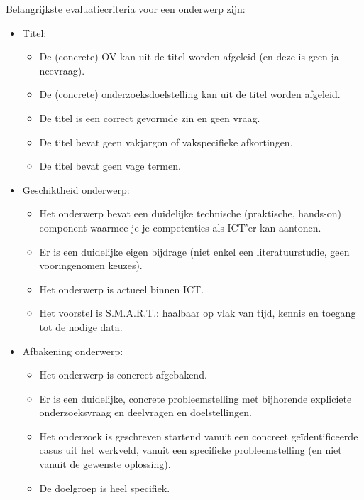Belangrijkste evaluatiecriteria voor een onderwerp zijn:

\begin{itemize}
  \item Titel:
  \begin{itemize}
    \item De (concrete) OV kan uit de titel worden afgeleid (en deze is geen ja-neevraag).
    \item De (concrete) onderzoeksdoelstelling kan uit de titel worden afgeleid.
    \item De titel is een correct gevormde zin en geen vraag.
    \item De titel bevat geen vakjargon of vakspecifieke afkortingen.
    \item De titel bevat geen vage termen.
  \end{itemize}
  \item Geschiktheid onderwerp:
  \begin{itemize}
    \item Het onderwerp bevat een duidelijke technische (praktische, hands-on) component waarmee je je competenties als ICT'er kan aantonen. 
    \item Er is een duidelijke eigen bijdrage (niet enkel een literatuurstudie, geen vooringenomen keuzes). 
    \item Het onderwerp is actueel binnen ICT.
    \item Het voorstel is S.M.A.R.T.: haalbaar op vlak van tijd, kennis en toegang tot de nodige data.
  \end{itemize}
  \item Afbakening onderwerp:
  \begin{itemize}
    \item Het onderwerp is concreet afgebakend. 
    \item Er is een duidelijke, concrete probleemstelling met bijhorende expliciete onderzoeksvraag en deelvragen en doelstellingen.
    \item Het onderzoek is geschreven startend vanuit een concreet geïdentificeer\-de casus uit het werkveld, vanuit een specifieke probleemstelling (en niet vanuit de gewenste oplossing).
    \item De doelgroep is heel specifiek. 
  \end{itemize}
\end{itemize}
